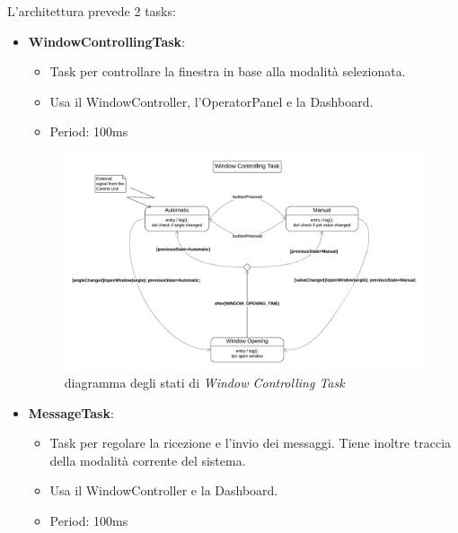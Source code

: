 \documentclass{report}
\begin{document}
\par{
L'architettura prevede 2 tasks: 
}
\begin{itemize}
    \item {
    \textbf{WindowControllingTask}: 
    \begin{itemize}
        \item {Task per controllare la finestra in base alla modalità selezionata.
        }
        \item {Usa il WindowController, l'OperatorPanel e la Dashboard.
        }
        \item {Period: 100ms
        }
    \end{itemize}
    \begin{figure}[H]
        \centering
        \includegraphics[width=1.2\linewidth]{img/assignment-03/Diagrammi per IOT - Window Controller subsystem.png}
        \caption{diagramma degli stati di \textit{Window Controlling Task}}
        \label{fig:window-controlling-task}
    \end{figure}
    }
    \item {
    \textbf{MessageTask}: 
    \begin{itemize}
        \item {Task per regolare la ricezione e l'invio dei messaggi. Tiene inoltre traccia della modalità corrente del sistema.
        }
        \item {Usa il WindowController e la Dashboard.
        }
        \item {Period: 100ms
        }
    \end{itemize}
    \begin{figure}[H]
        \centering

\end{figure}}
\end{itemize}
\end{document}
